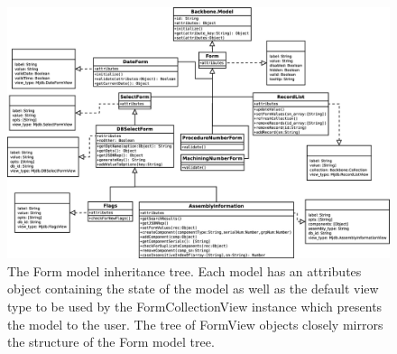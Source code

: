 \documentclass[journal]{IEEEtran}
\begin{document}
\clearpage

\begin{figure}[!p]
\centering
\includegraphics[width=7.5in]{Models}
\caption{The Form model inheritance tree. Each model has an attributes object containing the state of the model as well as the default
view type to be used by the FormCollectionView instance which presents the model to the user. The tree of FormView objects closely mirrors
the structure of the Form model tree.}
\label{models}
\end{figure}

\clearpage

%
%

\end{document}
